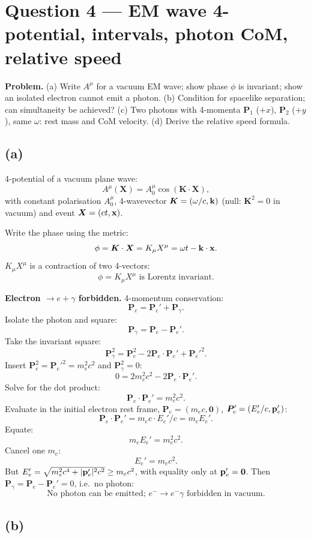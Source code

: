 \documentclass[11pt]{article}
\begin{document}
\section*{Question 4 --- EM wave 4-potential, intervals, photon CoM, relative speed}

\textbf{Problem.} (a) Write $A^\mu$ for a vacuum EM wave; show phase $\phi$ is invariant; show an isolated electron cannot emit a photon. (b) Condition for spacelike separation; can simultaneity be achieved? (c) Two photons with 4-momenta $\bm P_1$ ($+x$), $\bm P_2$ ($+y$), same $\omega$: rest mass and CoM velocity. (d) Derive the relative speed formula.

\subsection*{(a)}

4-potential of a vacuum plane wave:
\[ A^\mu(\bm X) = A_0^\mu \cos(\bm K\cdot\bm X), \]
with constant polarisation $A_0^\mu$, 4-wavevector $\bm K=(\omega/c,\vb k)$ (null: $\bm K^2=0$ in vacuum) and event $\bm X=(ct,\vb x)$.

Write the phase using the metric:
\[ \phi = \bm K\cdot\bm X = K_\mu X^\mu = \omega t - \vb k\cdot\vb x. \]
$K_\mu X^\mu$ is a contraction of two 4-vectors:
\[ \boxed{\;\phi = K_\mu X^\mu \text{ is Lorentz invariant}.\;} \]

\textbf{Electron $\to e + \gamma$ forbidden.} 4-momentum conservation:
\[ \bm P_e = \bm P_e' + \bm P_\gamma. \]
Isolate the photon and square:
\[ \bm P_\gamma = \bm P_e - \bm P_e'. \]
Take the invariant square:
\[ \bm P_\gamma^2 = \bm P_e^2 - 2\bm P_e\cdot\bm P_e' + \bm P_e'^2. \]
Insert $\bm P_e^2 = \bm P_e'^2 = m_e^2c^2$ and $\bm P_\gamma^2 = 0$:
\[ 0 = 2m_e^2c^2 - 2\bm P_e\cdot\bm P_e'. \]
Solve for the dot product:
\[ \bm P_e\cdot\bm P_e' = m_e^2 c^2. \]
Evaluate in the initial electron rest frame, $\bm P_e = (m_ec,\bm 0)$, $\bm P_e' = (E_e'/c,\vb p_e')$:
\[ \bm P_e\cdot\bm P_e' = m_e c\cdot E_e'/c = m_e E_e'. \]
Equate:
\[ m_e E_e' = m_e^2 c^2. \]
Cancel one $m_e$:
\[ E_e' = m_e c^2. \]
But $E_e' = \sqrt{m_e^2 c^4 + |\vb p_e'|^2 c^2}\ge m_e c^2$, with equality only at $\vb p_e'=\bm 0$. Then $\bm P_\gamma = \bm P_e-\bm P_e' = 0$, i.e.\ no photon:
\[ \boxed{\;\text{No photon can be emitted; }e^-\to e^-\gamma\text{ forbidden in vacuum}.\;} \]

\subsection*{(b)}
\end{document}
